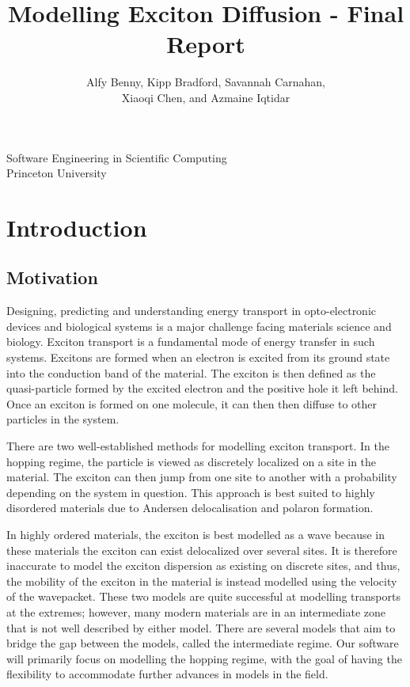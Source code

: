 \documentclass{article}
\title{Modelling Exciton Diffusion - Final Report}
\author{Alfy Benny, Kipp Bradford, Savannah Carnahan,\\ Xiaoqi Chen, and Azmaine Iqtidar}
\begin{document}
       \maketitle
      
       \vfill
            
       
            
      \vfill
     
       \begin{center}
            
       Software Engineering in Scientific Computing\\
       Princeton University\\
       
    \end{center}    
  
\newpage

\section{Introduction}

\subsection{Motivation}

Designing, predicting and understanding energy transport in opto-electronic devices and biological systems is a major challenge facing materials science and biology. Exciton transport is a fundamental mode of energy transfer in such systems. Excitons are formed when an electron is excited from its ground state into the conduction band of the material. The exciton is then defined as the quasi-particle formed by the excited electron and the positive hole it left behind. Once an exciton is formed on one molecule, it can then then diffuse to other particles in the system. 

There are two well-established methods for modelling exciton transport.\cite{Oberhofer2017ChargeMethods} In the hopping regime, the particle is viewed as discretely localized on a site in the material. The exciton can then jump from one site to another with a probability depending on the system in question. This approach is best suited to highly disordered materials due to Andersen delocalisation and polaron formation.\cite{DanielBalzer2021DelocalisedMaterials}

In highly ordered materials, the exciton is best modelled as a wave because in these materials the exciton can exist delocalized over several sites.\cite{Oberhofer2017ChargeMethods} It is therefore inaccurate to model the exciton dispersion as existing on discrete sites, and thus, the mobility of the exciton in the material is instead modelled using the velocity of the wavepacket. These two models are quite successful at modelling transports at the extremes; however, many modern materials are in an intermediate zone that is not well described by either model. There are several models that aim to bridge the gap between the models, called the intermediate regime. Our software will primarily focus on modelling the hopping regime, with the goal of having the flexibility to accommodate further advances in models in the field.
\end{document}
